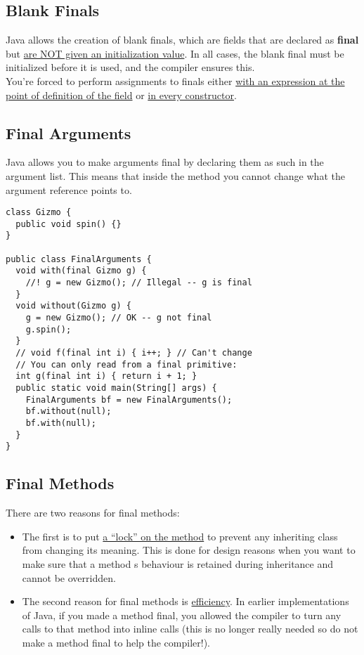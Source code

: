 \documentclass[10pt,letterpaper]{report}
\begin{document}
\subsection{Blank Finals}
Java allows the creation of blank finals, which are fields that are declared as \textbf{final} but \underline{are NOT given an initialization value}. In all cases, the blank final must be initialized before it is used, and the compiler ensures this.\\

You're forced to perform assignments to finals either \underline{with an expression at the} \underline{point of definition of the field} or \underline{in every constructor}.
\subsection{Final Arguments}
Java allows you to make arguments final by declaring them as such in the argument list. This means that inside the method you cannot change what the argument reference points to.
\begin{lstlisting}
class Gizmo {
  public void spin() {}
}

public class FinalArguments {
  void with(final Gizmo g) {
    //! g = new Gizmo(); // Illegal -- g is final
  }
  void without(Gizmo g) {
    g = new Gizmo(); // OK -- g not final
    g.spin();
  }
  // void f(final int i) { i++; } // Can't change
  // You can only read from a final primitive:
  int g(final int i) { return i + 1; }
  public static void main(String[] args) {
    FinalArguments bf = new FinalArguments();
    bf.without(null);
    bf.with(null);
  }
}
\end{lstlisting}
\subsection{Final Methods}
There are two reasons for final methods:
\begin{itemize}
\item The first is to put \underline{a ``lock'' on the method} to prevent any inheriting class from changing its meaning. This is done for design reasons when you want to make sure that a method s behaviour is retained during inheritance and cannot be overridden.
\item The second reason for final methods is \underline{efficiency}. In earlier implementations of Java, if you made a method final, you allowed the compiler to turn any calls to that method into inline calls (this is no longer really needed so do not make a method final to help the compiler!).
\end{itemize}
\end{document}
